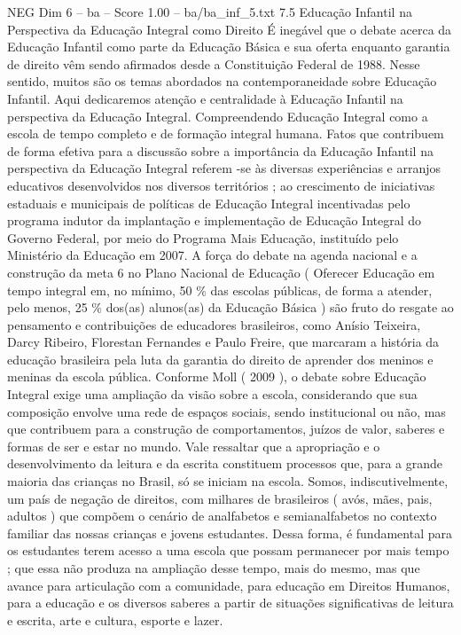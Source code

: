 \begin{textsample}{NEG Dim 6 – ba – Score 1.00 – ba/ba\_inf\_5.txt}  \label{ex:f6_neg_214}
7.5 Educação Infantil na Perspectiva da Educação Integral como Direito É inegável que o debate acerca da Educação Infantil como parte da Educação Básica e sua oferta enquanto garantia de direito vêm sendo afirmados desde a Constituição Federal de 1988.
Nesse sentido, muitos são os temas abordados na contemporaneidade sobre Educação Infantil.
Aqui dedicaremos atenção e centralidade à Educação Infantil na perspectiva da Educação Integral.
Compreendendo Educação Integral como a escola de tempo completo e de formação integral humana.
Fatos que contribuem de forma efetiva para a discussão sobre a importância da Educação Infantil na perspectiva da Educação Integral referem -se às diversas experiências e arranjos educativos desenvolvidos nos diversos territórios ; ao crescimento de iniciativas estaduais e municipais de políticas de Educação Integral incentivadas pelo programa indutor da implantação e implementação de Educação Integral do Governo Federal, por meio do Programa Mais Educação, instituído pelo Ministério da Educação em 2007.
A força do debate na agenda nacional e a construção da meta 6 no Plano Nacional de Educação ( Oferecer Educação em tempo integral em, no mínimo, 50 \% das escolas públicas, de forma a atender, pelo menos, 25 \% dos(as) alunos(as) da Educação Básica ) são fruto do resgate ao pensamento e contribuições de educadores brasileiros, como Anísio Teixeira, Darcy Ribeiro, Florestan Fernandes e Paulo Freire, que marcaram a história da educação brasileira pela luta da garantia do direito de aprender dos meninos e meninas da escola pública.
Conforme Moll ( 2009 ), o debate sobre Educação Integral exige uma ampliação da visão sobre a escola, considerando que sua composição envolve uma rede de espaços sociais, sendo institucional ou não, mas que contribuem para a construção de comportamentos, juízos de valor, saberes e formas de ser e estar no mundo.
Vale ressaltar que a apropriação e o desenvolvimento da leitura e da escrita constituem processos que, para a grande maioria das crianças no Brasil, só se iniciam na escola.
Somos, indiscutivelmente, um país de negação de direitos, com milhares de brasileiros ( avós, mães, pais, adultos ) que compõem o cenário de analfabetos e semianalfabetos no contexto familiar das nossas crianças e jovens estudantes.
Dessa forma, é fundamental para os estudantes terem acesso a uma escola que possam permanecer por mais tempo ; que essa não produza na ampliação desse tempo, mais do mesmo, mas que avance para articulação com a comunidade, para educação em Direitos Humanos, para a educação e os diversos saberes a partir de situações significativas de leitura e escrita, arte e cultura, esporte e lazer.

\end{textsample}
